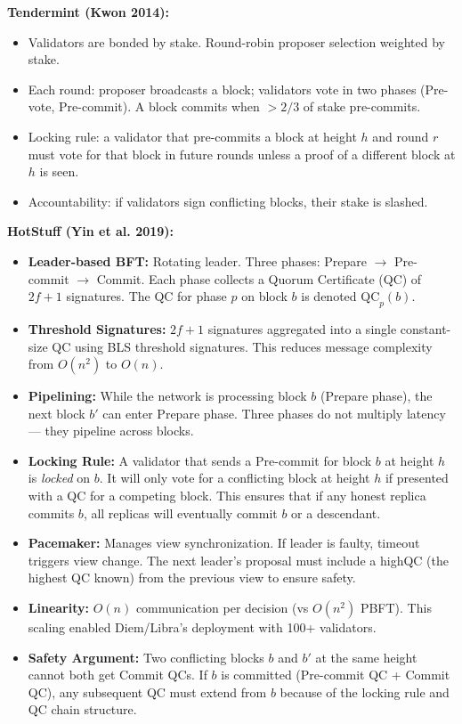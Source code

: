 \textbf{Tendermint (Kwon 2014):}
\begin{itemize}
\item Validators are bonded by stake. Round-robin proposer selection weighted by stake.
\item Each round: proposer broadcasts a block; validators vote in two phases (Pre-vote, Pre-commit). A block commits when $> 2/3$ of stake pre-commits.
\item Locking rule: a validator that pre-commits a block at height $h$ and round $r$ must vote for that block in future rounds unless a proof of a different block at $h$ is seen.
\item Accountability: if validators sign conflicting blocks, their stake is slashed.
\end{itemize}

\textbf{HotStuff (Yin et al. 2019):}
\begin{itemize}
\item \textbf{Leader-based BFT:} Rotating leader. Three phases: Prepare $\to$ Pre-commit $\to$ Commit. Each phase collects a Quorum Certificate (QC) of $2f+1$ signatures. The QC for phase $p$ on block $b$ is denoted $\text{QC}_p(b)$.
\item \textbf{Threshold Signatures:} $2f+1$ signatures aggregated into a single constant-size QC using BLS threshold signatures. This reduces message complexity from $O(n^2)$ to $O(n)$.
\item \textbf{Pipelining:} While the network is processing block $b$ (Prepare phase), the next block $b'$ can enter Prepare phase. Three phases do not multiply latency — they pipeline across blocks.
\item \textbf{Locking Rule:} A validator that sends a Pre-commit for block $b$ at height $h$ is \emph{locked} on $b$. It will only vote for a conflicting block at height $h$ if presented with a QC for a competing block. This ensures that if any honest replica commits $b$, all replicas will eventually commit $b$ or a descendant.
\item \textbf{Pacemaker:} Manages view synchronization. If leader is faulty, timeout triggers view change. The next leader's proposal must include a highQC (the highest QC known) from the previous view to ensure safety.
\item \textbf{Linearity:} $O(n)$ communication per decision (vs $O(n^2)$ PBFT). This scaling enabled Diem/Libra's deployment with 100+ validators.
\item \textbf{Safety Argument:} Two conflicting blocks $b$ and $b'$ at the same height cannot both get Commit QCs. If $b$ is committed (Pre-commit QC + Commit QC), any subsequent QC must extend from $b$ because of the locking rule and QC chain structure.
\end{itemize}

